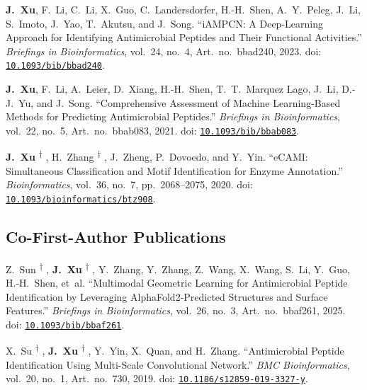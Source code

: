 \documentclass[10pt,a4paper]{article}
\newcommand{\equalcontrib}{%
  \textsuperscript{\ensuremath{\dagger}}%
}
\begin{document}
\begin{enumerate}[label={[\arabic*]}, before={\interlinepenalty=10000}]
\item
\textbf{J.~Xu}, F.~Li, C.~Li, X.~Guo, C.~Landersdorfer, H.-H.~Shen, A.~Y.~Peleg, J.~Li, S.~Imoto, J.~Yao, T.~Akutsu, and J.~Song.
``iAMPCN: A Deep-Learning Approach for Identifying Antimicrobial Peptides and Their Functional Activities.''
\textit{Briefings in Bioinformatics}, vol.~24, no.~4, Art.~no.~bbad240, 2023.
doi: \href{https://doi.org/10.1093/bib/bbad240}{\nolinkurl{10.1093/bib/bbad240}}.

\item
\textbf{J.~Xu}, F.~Li, A.~Leier, D.~Xiang, H.-H.~Shen, T.~T.~Marquez Lago, J.~Li, D.-J.~Yu, and J.~Song.
``Comprehensive Assessment of Machine Learning-Based Methods for Predicting Antimicrobial Peptides.''
\textit{Briefings in Bioinformatics}, vol.~22, no.~5, Art.~no.~bbab083, 2021.
doi: \href{https://doi.org/10.1093/bib/bbab083}{\nolinkurl{10.1093/bib/bbab083}}.

\item
\textbf{J.~Xu}\equalcontrib, H.~Zhang\equalcontrib, J.~Zheng, P.~Dovoedo, and Y.~Yin.
``eCAMI: Simultaneous Classification and Motif Identification for Enzyme Annotation.''
\textit{Bioinformatics}, vol.~36, no.~7, pp.~2068--2075, 2020.
doi: \href{https://doi.org/10.1093/bioinformatics/btz908}{\nolinkurl{10.1093/bioinformatics/btz908}}.



\end{enumerate}

\subsection*{Co-First-Author Publications}
\begin{enumerate}[label={[\arabic*]}, before={\interlinepenalty=10000}]

\item
Z.~Sun\equalcontrib, \textbf{J.~Xu}\equalcontrib, Y.~Zhang, Y.~Zhang, Z.~Wang, X.~Wang, S.~Li, Y.~Guo, H.-H.~Shen, et~al.
``Multimodal Geometric Learning for Antimicrobial Peptide Identification by Leveraging AlphaFold2-Predicted Structures and Surface Features.''
\textit{Briefings in Bioinformatics}, vol.~26, no.~3, Art.~no.~bbaf261, 2025.
doi: \href{https://doi.org/10.1093/bib/bbaf261}{\nolinkurl{10.1093/bib/bbaf261}}.


\item
X.~Su\equalcontrib, \textbf{J.~Xu}\equalcontrib, Y.~Yin, X.~Quan, and H.~Zhang.
``Antimicrobial Peptide Identification Using Multi-Scale Convolutional Network.''
\textit{BMC Bioinformatics}, vol.~20, no.~1, Art.~no.~730, 2019.
doi: \href{https://doi.org/10.1186/s12859-019-3327-y}{\nolinkurl{10.1186/s12859-019-3327-y}}.

\end{enumerate}
\end{document}
